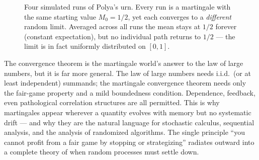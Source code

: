 \begin{figure}[H]
\centering
{}
\caption{Four simulated runs of Polya's urn. Every run is a martingale with the same starting value
$M_0 = 1/2$, yet each converges to a \emph{different} random limit. Averaged across all runs the mean
stays at $1/2$ forever (constant expectation), but no individual path returns to $1/2$ --- the limit is
in fact uniformly distributed on $[0,1]$.}
\label{ch28:fig-polya}
\end{figure}

\begin{aestheticbox}
The convergence theorem is the martingale world's answer to the law of large numbers, but it is far
more general. The law of large numbers needs i.i.d.\ (or at least independent) summands; the martingale
convergence theorem needs only the fair-game property and a mild boundedness condition. Dependence,
feedback, even pathological correlation structures are all permitted. This is why martingales appear
wherever a quantity evolves with memory but no systematic drift --- and why they are the natural
language for stochastic calculus, sequential analysis, and the analysis of randomized algorithms. The
single principle ``you cannot profit from a fair game by stopping or strategizing'' radiates outward
into a complete theory of when random processes must settle down.
\end{aestheticbox}

